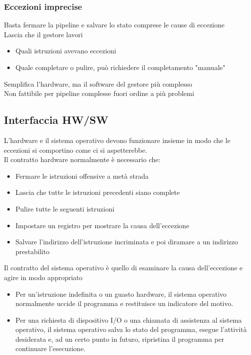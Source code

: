 \documentclass[12pt,a4paper]{article}
\begin{document}
\subsubsection{Eccezioni imprecise}
Basta fermare la pipeline e salvare lo stato comprese le cause di eccezione\\
Lascia che il gestore lavori
\begin{itemize}
\item Quali istruzioni avevano eccezioni
\item Quale completare o pulire, può richiedere il completamento "manuale"
\end{itemize}
Semplifica l'hardware, ma il software del gestore più complesso\\
Non fattibile per pipeline complesse fuori ordine a più problemi

\subsection{Interfaccia HW/SW}
L'hardware e il sistema operativo devono funzionare insieme in modo che le eccezioni si comportino come ci si aspetterebbe.\\
Il contratto hardware normalmente è necessario che:
\begin{itemize}
\item Fermare le istruzioni offensive a metà strada
\item Lascia che tutte le istruzioni precedenti siano complete
\item Pulire tutte le seguenti istruzioni
\item Impostare un registro per mostrare la causa dell'eccezione
\item Salvare l'indirizzo dell'istruzione incriminata e poi diramare a un indirizzo prestabilito
\end{itemize}
Il contratto del sistema operativo è quello di esaminare la causa dell'eccezione e agire in modo appropriato
\begin{itemize}
\item Per un'istruzione indefinita o un guasto hardware, il sistema operativo normalmente uccide il programma e restituisce un indicatore del motivo.
\item Per una richiesta di dispositivo I/O o una chiamata di assistenza al sistema operativo, il sistema operativo salva lo stato del programma, esegue l'attività desiderata e, ad un certo punto in futuro, ripristina il programma per continuare l'esecuzione.
\end{itemize}
\end{document}
